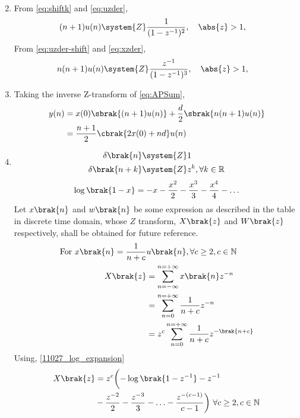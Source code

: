 \begin{enumerate}[label=\thesubsection.\arabic*,ref=\thesubsection.\theenumi]
\begin{align}
\end{align}
\item From 
\eqref{eq:shiftk} and
	       \eqref{eq:uzder},
\begin{align}
(n+1) u(n) &\system{Z} \frac{1}{({1-z^{-1}})^2}, \quad \abs{z} > 1
	       \label{eq:uzder-shift},
\end{align}
From  \eqref{eq:uzder-shift} and \eqref{eq:xzder},
\begin{align}
n(n+1) u(n) &\system{Z} \frac{z^{-1}}{({1-z^{-1}})^3}, \quad \abs{z} > 1
	       \label{eq:uzder-der},
\end{align}
	       
\item Taking the inverse Z-transform of \eqref{eq:APSum},
\begin{align}
y(n) &= x(0)\sbrak{(n + 1)u(n)} + \frac{d}{2}\sbrak{n(n + 1)u(n)}\\
&= \frac{n+1}{2}\cbrak{2x(0) + nd}u(n)
\end{align}


\item
	\iffalse
\begin{table}[ht]

\end{table}
\fi
\begin{align}
	\delta\brak{n} &\system{Z} 1 \\
	\delta\brak{n+k} &\system{Z}z^{k} ,\forall k\in \mathbb{R} \label{11027_delta_func}
\end{align}
\begin{align}
        \log\brak{1-x} = -x - \frac{x^2}{2} - \frac{x^3}{3}-\frac{x^4}{4}- \ldots \label{11027_log_expansion}
\end{align}
Let $x\brak{n}$ and $w\brak{n}$ be some expression as described in the table in discrete time domain, whose $Z$ transform, $X\brak{z}$ and $W\brak{z}$ respectively, shall be obtained for future reference.\\
\begin{align}
    \notag \text{For }  x\brak{n} = \frac{1}{n+c} &u\brak{n},\forall c \geq 2,c \in \mathbb{N}\\
    X\brak{z} &= \sum_{n= -\infty}^{n= +\infty} x\brak{n}z^{-n}\\
    &=\sum_{n = 0}^{n = +\infty} \frac{1}{n+c}z^{-n}\\
    &= z^c\sum_{n = 0}^{n = +\infty} \frac{1}{n+c}z^{-\brak{n+c}}
\end{align}
Using, \eqref{11027_log_expansion}
\begin{align}
    X\brak{z}&= z^c \biggl(-\log\brak{1-z^{-1}}- z^{-1}\notag\\& -\frac{z^{-2}}{2}-\frac{z^{-3}}{3} - \ldots -\frac{z^{-(c-1)}}{c-1} \biggr)\ \forall c \geq 2, c \in \mathbb{N} \label{11027_when_c_not_1}
\end{align} 


\end{enumerate}
